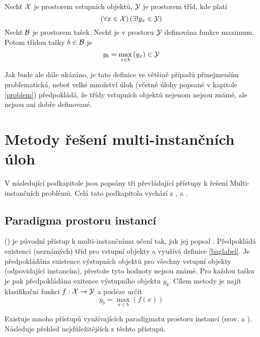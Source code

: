 \begin{define}\label{baglabel}
	Nechť \( \mathcal X \) je prostorem vstupních objektů, \( \mathcal Y \) je prostorem tříd, kde platí
	\[ \left( \forall x \in \mathcal X \right) \left( \exists ! y_x \in \mathcal Y \right) \]
	Nechť \( \mathcal B \) je prostorem tašek. Nechť je v prostoru \( \mathcal Y \) definována funkce maximum. Potom třídou tašky \( b \in \mathcal B \) je
	\[ y_b = \max_{x \in b} \left( y_x \right) \in \mathcal Y \]
\end{define}

Jak bude ale dále ukázáno, je tato definice ve většině případů přinejmenším problematická, neboť velké množství úloh (včetně úlohy popsané v kapitole \ref{problem}) předpokládá, že třídy vstupních objektů nejenom nejsou známé, ale nejsou ani dobře definované.

\section{Metody řešení multi-instančních úloh}

V následující podkapitole jsou popsány tři převládající přístupy k řešení Multi-instančních problémů. Celá tato podkapitola vychází z \cite{pevny_using_2016}, \cite{pevny_discriminative_2016} a \cite{amores_multiple_2013}.

\subsection{Paradigma prostoru instancí}
 () je původní přístup k multi-instančnímu učení tak, jak jej popsal \cite{dietterich_solving_1997}. Předpokládá existenci (neznámých) tříd pro vstupní objekty a využívá definice \ref{baglabel}.
Je předpokládána existence výstupních objektů pro všechny vstupní objekty (odpovídající instancím), přestože tyto hodnoty nejsou známé. Pro každou tašku je pak předpokládána exitence výstupního objektu \( y_b \). Cílem metody je najít klasifikační funkci \( f : \mathcal X \to \mathcal Y \) a posléze určit
\[ y_b = \max_{x \in b} \left( f \left( x \right) \right) \]

Existuje mnoho přístupů využívajících paradigmatu prostoru instancí (srov. \cite{andrews_support_2003} a \cite{zhang_multiple_2006}). Následuje přehled nejdůležitějších z těchto přístupů.

